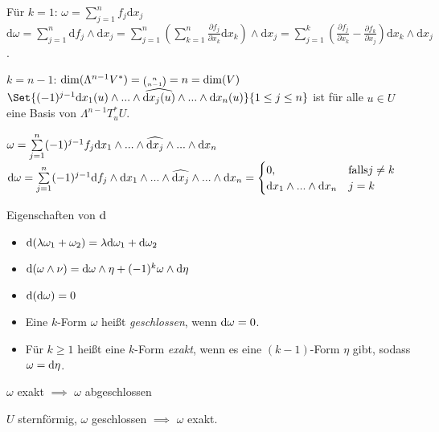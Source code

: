 \documentclass{cheat-sheet}
\let\myBinom\binom
\renewcommand{\binom}[2]{\mathsmaller{\myBinom{#1}{#2}}}
\begin{document}
\begin{bsp}
  Für $k = 1$: $\omega = \sum_{j = 1}^n f_j \mathrm{d} x_j$
  $\mathrm{d} \omega = \sum_{j=1}^n \mathrm{d} f_j \wedge \mathrm{d} x_j = \sum_{j=1}^n (\sum_{k=1}^n \frac{\partial f_j}{\partial x_k} \mathrm{d} x_k) \wedge \mathrm{d} x_j = \sum_{j=1}^k (\frac{\partial f_j}{\partial x_k} - \frac{\partial f_k}{\partial x_j}) \mathrm{d}x_k \wedge \mathrm{d}x_j$.

  $k = n -1$: $\mathrm{dim}(\Lambda^{n-1} V^*) = \binom{n}{n-1} = n = \mathrm{dim}(V)$
  $\Set{ (-1)^{j-1} \mathrm{d} x_1(u) \wedge ... \wedge \widehat{\mathrm{d} x_j(u)} \wedge ... \wedge \mathrm{d} x_n(u) }{ 1 \leq j \leq n }$ ist für alle $u \in U$ eine Basis von $\Lambda^{n-1} T_u^* U$.

  $\omega = \sum_{j=1}^n (-1)^{j-1} f_j \d x_1 \wedge ... \wedge \widehat{\d x_j} \wedge ... \wedge \d x_n$
  $\d \omega = \sum_{j=1}^n (-1)^{j-1} \d f_j \wedge \d x_1 \wedge ... \wedge \widehat{\d x_j} \wedge ... \wedge \d x_n = \begin{cases} 0, & \text{falls} j \not= k \\ \d x_1 \wedge ... \wedge \d x_n & j = k \end{cases}$
\end{bsp}


\begin{satz}
  Eigenschaften von $\mathrm{d}$

  \begin{itemize}
    \item $\mathrm{d}(\lambda \omega_1 + \omega_2) = \lambda \mathrm{d} \omega_1 + \mathrm{d} \omega_2$
    \item $\mathrm{d} (\omega \wedge \nu) = \mathrm{d} \omega \wedge \eta + (-1)^k \omega \wedge \mathrm{d} \eta$
    \item $\mathrm{d} (\mathrm{d} \omega) = 0$
  \end{itemize}
\end{satz}

\begin{defn}
  \begin{itemize}
    \item Eine $k$-Form $\omega$ heißt \emph{geschlossen}, wenn $\mathrm{d} \omega = 0$.
    \item Für $k \geq 1$ heißt eine $k$-Form \emph{exakt}, wenn es eine $(k-1)$-Form $\eta$ gibt, sodass $\omega = \mathrm{d} \eta$.
  \end{itemize}
\end{defn}

\begin{beobachtung}
  $\omega$ exakt $\implies$ $\omega$ abgeschlossen
\end{beobachtung}


\begin{lem}[Poincaré]
  $U$ sternförmig, $\omega$ geschlossen $\implies$ $\omega$ exakt.
\end{lem}
\end{document}
